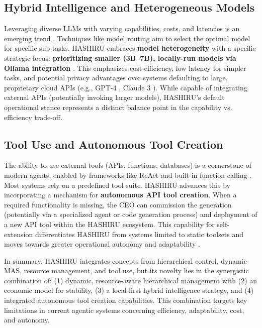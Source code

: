 \documentclass[conference]{IEEEtran}
\begin{document}
\subsection{Hybrid Intelligence and Heterogeneous Models}
Leveraging diverse LLMs with varying capabilities, costs, and latencies is an emerging trend \cite{zhou2023agents}. Techniques like model routing aim to select the optimal model for specific sub-tasks. HASHIRU embraces \textbf{model heterogeneity} with a specific strategic focus: \textbf{prioritizing smaller (3B--7B), locally-run models via Ollama integration} \cite{ollama}. This emphasizes cost-efficiency, low latency for simpler tasks, and potential privacy advantages over systems defaulting to large, proprietary cloud APIs (e.g., GPT-4 \cite{openai2023gpt4}, Claude 3 \cite{anthropic2024claude}). While capable of integrating external APIs (potentially invoking larger models), HASHIRU's default operational stance represents a distinct balance point in the capability vs. efficiency trade-off.

\subsection{Tool Use and Autonomous Tool Creation}
The ability to use external tools (APIs, functions, databases) is a cornerstone of modern agents, enabled by frameworks like ReAct \cite{yao2022react} and built-in function calling \cite{openai_func_calling}. Most systems rely on a predefined tool suite. HASHIRU advances this by incorporating a mechanism for \textbf{autonomous API tool creation}. When a required functionality is missing, the CEO can commission the generation (potentially via a specialized agent or code generation process) and deployment of a new API tool within the HASHIRU ecosystem. This capability for self-extension differentiates HASHIRU from systems limited to static toolsets and moves towards greater operational autonomy and adaptability \cite{wang2023voyager, park2023generative}.

In summary, HASHIRU integrates concepts from hierarchical control, dynamic MAS, resource management, and tool use, but its novelty lies in the synergistic combination of: (1) dynamic, resource-aware hierarchical management with (2) an economic model for stability, (3) a local-first hybrid intelligence strategy, and (4) integrated autonomous tool creation capabilities. This combination targets key limitations in current agentic systems concerning efficiency, adaptability, cost, and autonomy.
\end{document}
